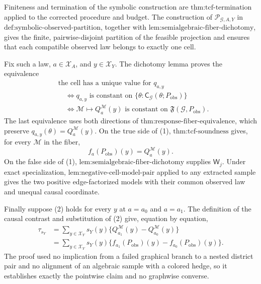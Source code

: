 Finiteness and termination of the symbolic construction are \(\text{thm:tcf-termination}\) applied to the corrected procedure and budget. The construction of \(\mathscr P_{\mathcal G,A,Y}\) in \(\text{def:symbolic-observed-partition}\), together with \(\text{lem:semialgebraic-fiber-dichotomy}\), gives the finite, pairwise-disjoint partition of the feasible projection and ensures that each compatible observed law belongs to exactly one cell.

Fix such a law, \(a\in\mathcal X_A\), and \(y\in\mathcal X_Y\). The dichotomy lemma proves the equivalence
\[
\begin{aligned}
&\text{the cell has a unique value for }q_{a,y}\\
&\quad\Longleftrightarrow
q_{a,y}\text{ is constant on }
\{\theta:\mathsf C_{\mathcal G}(\theta;P_{\mathrm{obs}})\}\\
&\quad\Longleftrightarrow
\mathcal M\longmapsto Q_a^{\mathcal M}(y)
\text{ is constant on }\mathfrak F(\mathcal G,P_{\mathrm{obs}}).
\end{aligned}
\tag{1}
\]
The last equivalence uses both directions of \(\text{thm:response-fiber-equivalence}\), which preserve \(q_{a,y}(\theta)=Q_a^{\mathcal M}(y)\). On the true side of (1), \(\text{thm:tcf-soundness}\) gives, for every \(\mathcal M\) in the fiber,
\[
f_a(P_{\mathrm{obs}})(y)=Q_a^{\mathcal M}(y).
\tag{2}
\]
On the false side of (1), \(\text{lem:semialgebraic-fiber-dichotomy}\) supplies \(\mathsf W_j\). Under exact specialization, \(\text{lem:negative-cell-model-pair}\) applied to any extracted sample gives the two positive edge-factorized models with their common observed law and unequal causal coordinate.

Finally suppose (2) holds for every \(y\) at \(a=a_0\) and \(a=a_1\). The definition of the causal contrast and substitution of (2) give, equation by equation,
\[
\begin{aligned}
\tau_{s_Y}
&=\sum_{y\in\mathcal X_Y}s_Y(y)
  \{Q_{a_1}^{\mathcal M}(y)-Q_{a_0}^{\mathcal M}(y)\}\\
&=\sum_{y\in\mathcal X_Y}s_Y(y)
  \{f_{a_1}(P_{\mathrm{obs}})(y)-f_{a_0}(P_{\mathrm{obs}})(y)\}.
\end{aligned}
\]
The proof used no implication from a failed graphical branch to a nested district pair and no alignment of an algebraic sample with a colored hedge, so it establishes exactly the pointwise claim and no graphwise converse.